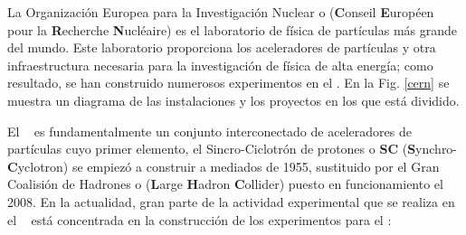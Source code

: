 La Organización Europea para la Investigación Nuclear o \CERN (\textbf{C}onseil \textbf{E}uropéen pour la \textbf{R}echerche \textbf{N}ucléaire) es el laboratorio de física de partículas más grande del mundo. Este laboratorio proporciona los aceleradores de partículas y otra infraestructura necesaria para la investigación de física de alta energía; como resultado, se han construido numerosos experimentos en el \CERN. En la Fig. \ref{cern} se muestra un diagrama de las instalaciones y los proyectos en los que está dividido. 

El \CERN ~ es fundamentalmente un conjunto interconectado de aceleradores de partículas cuyo primer elemento, el Sincro-Ciclotrón de protones o \textbf{SC} (\textbf{S}ynchro-\textbf{C}yclotron) se empiezó a construir a mediados de 1955, sustituido por el Gran Coalisión de Hadrones  o \LHC (\textbf{L}arge \textbf{H}adron \textbf{C}ollider) puesto en funcionamiento el 2008. En la actualidad, gran parte de la actividad experimental que se realiza en el \CERN ~ está concentrada en la construcción de los experimentos para el \LHC:
